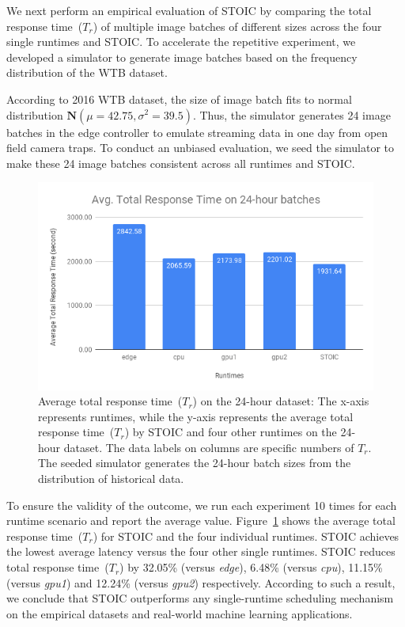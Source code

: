 %     


We next perform an empirical evaluation of STOIC by comparing the total response time~($T_r$) of multiple image batches of different sizes across the four single runtimes and STOIC.  To accelerate the repetitive experiment, we developed a simulator to generate image batches based on the frequency distribution of the WTB dataset. 

According to 2016 WTB dataset, the size of image batch fits to normal distribution $\mathbf{N}(\mu = 42.75, \sigma^2 = 39.5)$. Thus, the simulator generates 24 image batches in the edge controller to emulate streaming data in one day from open field camera traps. To conduct an unbiased evaluation, we seed the simulator to make these 24 image batches consistent across all runtimes and STOIC. 

\begin{figure}[t] \centering 
\includegraphics[scale=0.42]{figures/24-batches}
\caption{Average total response time~($T_r$) on the 24-hour dataset: The x-axis represents runtimes, while the y-axis represents the average total response time~($T_r$) by STOIC and four other runtimes on the 24-hour dataset. The data labels on columns are specific numbers of $T_r$. The seeded simulator generates the 24-hour batch sizes from the distribution of historical data. 
\label{fig:24-batch}}
\end{figure}

To ensure the validity of the outcome, we run each experiment 10 times for each runtime scenario and report the average value. Figure~\ref{fig:24-batch} shows the average total response time~($T_r$) for STOIC and the four individual runtimes. STOIC achieves the lowest average latency versus the four other single runtimes.  STOIC reduces total response time~($T_r$) by 32.05\% (versus \textit{edge}), 6.48\% (versus \textit{cpu}), 11.15\% (versus \textit{gpu1}) and 12.24\% (versus \textit{gpu2}) respectively. According to such a result, we conclude that STOIC outperforms any single-runtime scheduling mechanism on the empirical datasets and real-world machine learning applications.
